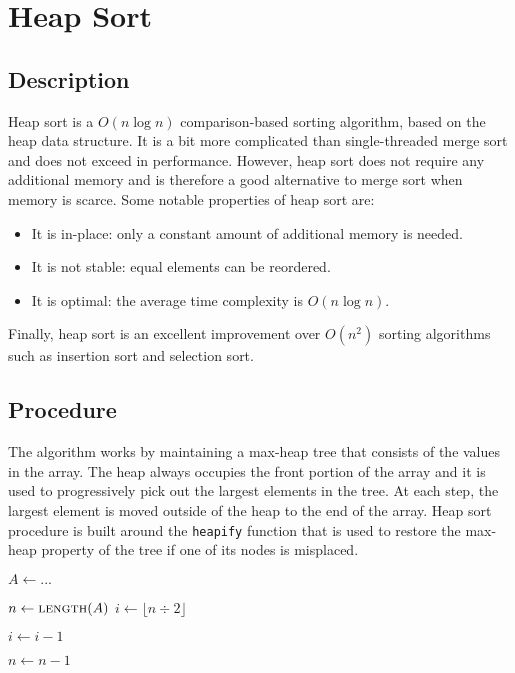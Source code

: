 \section{Heap Sort}

\subsection{Description}

Heap sort is a $O(n \log n)$ comparison-based sorting algorithm, based on the heap data structure. It is a bit more complicated than single-threaded merge sort and does not exceed in performance. However, heap sort does not require any additional memory and is therefore a good alternative to merge sort when memory is scarce. Some notable properties of heap sort are:

\begin{itemize}
    \item It is in-place: only a constant amount of additional memory is needed.
    \item It is not stable: equal elements can be reordered.
    \item It is optimal: the average time complexity is $O(n \log n)$.
\end{itemize}

Finally, heap sort is an excellent improvement over $O(n^2)$ sorting algorithms such as insertion sort and selection sort.

\subsection{Procedure}

The algorithm works by maintaining a max-heap tree that consists of the values in the array. The heap always occupies the front portion of the array and it is used to progressively pick out the largest elements in the tree. At each step, the largest element is moved outside of the heap to the end of the array. Heap sort procedure is built around the \texttt{heapify} function that is used to restore the max-heap property of the tree if one of its nodes is misplaced.

\begin{algorithmic}[1]
    \State $A \gets ...$
    
    \State $n \gets \Call{length}{A}$
    \State $i \gets \lfloor n \div 2 \rfloor$ \label{heap:root}
    
     \label{heap:build}
        \State {}
        \State $i \gets i - 1$
    \EndWhile

        \State {} \label{heap:swap}
        \State $n \gets n - 1$
        \State {} \label{heap:fix}
    \EndWhile
\end{algorithmic}

